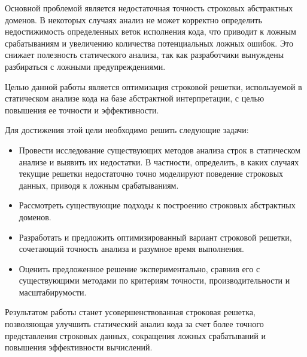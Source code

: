 Основной проблемой является недостаточная точность строковых абстрактных доменов. В некоторых случаях анализ не может корректно определить недостижимость определенных веток исполнения кода, что приводит к ложным срабатываниям и увеличению количества потенциальных ложных ошибок. Это снижает полезность статического анализа, так как разработчики вынуждены разбираться с ложными предупреждениями.

Целью данной работы является оптимизация строковой решетки, используемой в статическом анализе кода на базе абстрактной интерпретации, с целью повышения ее точности и эффективности.

Для достижения этой цели необходимо решить следующие задачи:

\begin{itemize}
\item Провести исследование существующих методов анализа строк в статическом анализе и выявить их недостатки. В частности, определить, в каких случаях текущие решетки недостаточно точно моделируют поведение строковых данных, приводя к ложным срабатываниям.

\item Рассмотреть существующие подходы к построению строковых абстрактных доменов.

\item Разработать и предложить оптимизированный вариант строковой решетки, сочетающий точность анализа и разумное время выполнения.

\item Оценить предложенное решение экспериментально, сравнив его с существующими методами по критериям точности, производительности и масштабирумости.
\end{itemize}

Результатом работы станет усовершенствованная строковая решетка, позволяющая улучшить статический анализ кода за счет более точного представления строковых данных, сокращения ложных срабатываний и повышения эффективности вычислений.

\newpage
